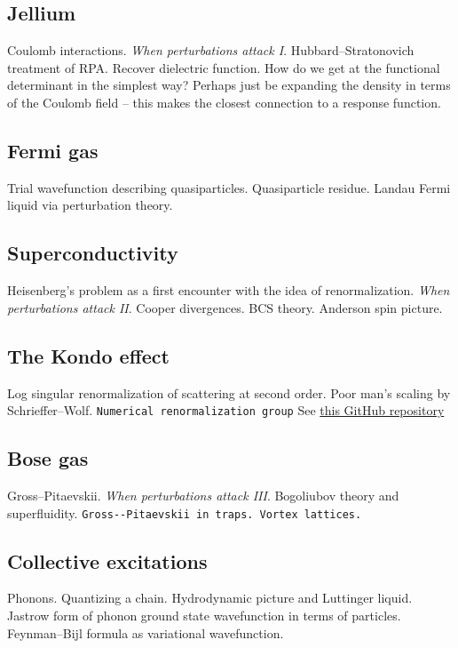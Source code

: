 \subsection{Jellium}

Coulomb interactions. \emph{When perturbations attack I}. Hubbard--Stratonovich treatment of RPA. Recover dielectric function. How do we get at the functional determinant in the simplest way? Perhaps just be expanding the density in terms of the Coulomb field -- this makes the closest connection to a response function.

\subsection{Fermi gas}

Trial wavefunction describing quasiparticles. Quasiparticle residue. Landau Fermi liquid via perturbation theory. 

\subsection{Superconductivity}

Heisenberg's problem as a first encounter with the idea of renormalization. \emph{When perturbations attack II}. Cooper divergences. BCS theory. Anderson spin picture.

\subsection{The Kondo effect}

Log singular renormalization of scattering at second order. Poor man's scaling by Schrieffer--Wolf. \verb|Numerical renormalization group| See \href{https://github.com/LucasNogueiraMartins/NRG-Didactic}{this GitHub repository}

\subsection{Bose gas}

Gross--Pitaevskii. \emph{When perturbations attack III}. Bogoliubov theory and superfluidity. \verb|Gross--Pitaevskii in traps. Vortex lattices.|

\subsection{Collective excitations}

Phonons. Quantizing a chain. Hydrodynamic picture and Luttinger liquid. Jastrow form of phonon ground state wavefunction in terms of particles. Feynman–Bijl formula as variational wavefunction. 

